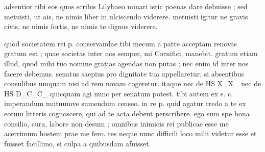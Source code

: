 


 adsentior tibi eos quos scribis Lilybaeo minari istic poenas dare debuisse ; sed metuisti, ut ais, ne nimis liber in ulciscendo viderere. metuisti igitur ne gravis civis, ne nimis fortis, ne nimis te dignus viderere.

 quod societatem rei p. conservandae tibi mecum a patre acceptam renovas gratum est ; quae societas inter nos semper, mi Cornifici, manebit. gratum etiam illud, quod mihi tuo nomine gratias agendas non putas ; nec enim id inter nos facere debemus. senatus saepius pro dignitate tua appellaretur, si absentibus consulibus umquam nisi ad rem novam cogeretur. itaque nec de HS X_X_ nec de HS D_C_C_ quicquam agi nunc per senatum potest. tibi autem ex s. c. imperandum mutuumve sumendum censeo. in re p. quid agatur credo a te ex eorum litteris cognoscere, qui ad te acta debent perscribere. ego sum spe bona consilio, cura, labore non desum ; omnibus inimicis rei publicae esse me acerrimum hostem prae me fero. res neque nunc difficili loco mihi videtur esse et fuisset facillimo, si culpa a quibusdam afuisset.
